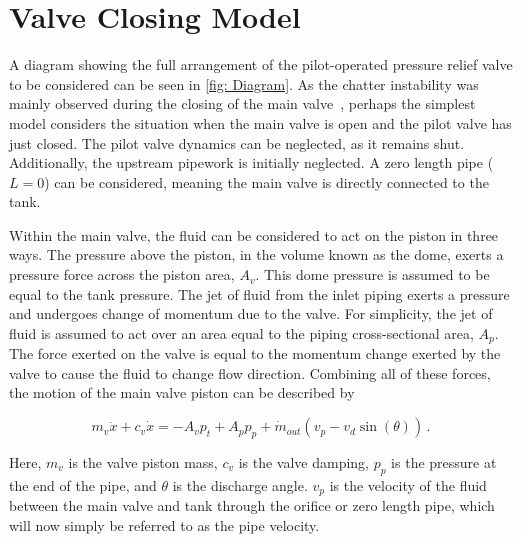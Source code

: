\section{Valve Closing Model} \label{sec: Prog}

A diagram showing the full arrangement of the pilot-operated pressure relief valve to be considered can be seen in \cref{fig: Diagram}. As the chatter instability was mainly observed during the closing of the main valve~\cite{Allison2015TestingValves}, perhaps the simplest model considers the situation when the main valve is open and the pilot valve has just closed. The pilot valve dynamics can be neglected, as it remains shut. Additionally, the upstream pipework is initially neglected. A zero length pipe ($L=0$) can be considered, meaning the main valve is directly connected to the tank. 



Within the main valve, the fluid can be considered to act on the piston in three ways. The pressure above the piston, in the volume known as the dome, exerts a pressure force across the piston area, $A_v$. This dome pressure is assumed to be equal to the tank pressure. The jet of fluid from the inlet piping exerts a pressure and undergoes change of momentum due to the valve. For simplicity, the jet of fluid is assumed to act over an area equal to the piping cross-sectional area, $A_p$. The force exerted on the valve is equal to the momentum change exerted by the valve to cause the fluid to change flow direction. Combining all of these forces, the motion of the main valve piston can be described by

\begin{equation} \label{eq: Newton}
    m_v \ddot{x} + c_v \dot{x} = - A_v p_t + A_p p_p + \dot{m}_{out} \left( v_p - v_d \sin(\theta) \right) \, .
\end{equation}

Here, $m_v$ is the valve piston mass, $c_v$ is the valve damping, $p_p$ is the pressure at the end of the pipe, and $\theta$ is the discharge angle. $v_p$ is the velocity of the fluid between the main valve and tank through the orifice or zero length pipe, which will now simply be referred to as the pipe velocity.

